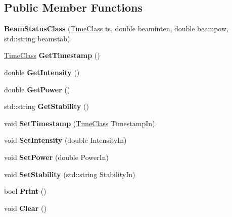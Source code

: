\subsection*{Public Member Functions}
\begin{DoxyCompactItemize}
\item 
\hypertarget{classBeamStatusClass_a16f64e35b4c0c7fb4565b930393cf0dc}{{\bfseries Beam\-Status\-Class} (\hyperlink{classTimeClass}{Time\-Class} ts, double beaminten, double beampow, std\-::string beamstab)}\label{classBeamStatusClass_a16f64e35b4c0c7fb4565b930393cf0dc}

\item 
\hypertarget{classBeamStatusClass_a3099faed7d12197a62ee27dacee0d32d}{\hyperlink{classTimeClass}{Time\-Class} {\bfseries Get\-Timestamp} ()}\label{classBeamStatusClass_a3099faed7d12197a62ee27dacee0d32d}

\item 
\hypertarget{classBeamStatusClass_aee60c7ca2561a801cb80d6c239ca2189}{double {\bfseries Get\-Intensity} ()}\label{classBeamStatusClass_aee60c7ca2561a801cb80d6c239ca2189}

\item 
\hypertarget{classBeamStatusClass_abf408e07c997e60b084dc613d5fda75c}{double {\bfseries Get\-Power} ()}\label{classBeamStatusClass_abf408e07c997e60b084dc613d5fda75c}

\item 
\hypertarget{classBeamStatusClass_a052d6ca339a0ca531de200a6cb790fad}{std\-::string {\bfseries Get\-Stability} ()}\label{classBeamStatusClass_a052d6ca339a0ca531de200a6cb790fad}

\item 
\hypertarget{classBeamStatusClass_a26f08683ffd71565d38714886b130459}{void {\bfseries Set\-Timestamp} (\hyperlink{classTimeClass}{Time\-Class} Timestamp\-In)}\label{classBeamStatusClass_a26f08683ffd71565d38714886b130459}

\item 
\hypertarget{classBeamStatusClass_a6ad6d7fe6847a45a043115f6b452ce4a}{void {\bfseries Set\-Intensity} (double Intensity\-In)}\label{classBeamStatusClass_a6ad6d7fe6847a45a043115f6b452ce4a}

\item 
\hypertarget{classBeamStatusClass_a93db8cf0576994acb051c0c17d714e13}{void {\bfseries Set\-Power} (double Power\-In)}\label{classBeamStatusClass_a93db8cf0576994acb051c0c17d714e13}

\item 
\hypertarget{classBeamStatusClass_a4bae86f8f8d6ab9b74dbe73f456a97c6}{void {\bfseries Set\-Stability} (std\-::string Stability\-In)}\label{classBeamStatusClass_a4bae86f8f8d6ab9b74dbe73f456a97c6}

\item 
\hypertarget{classBeamStatusClass_a5a45cde713baaa1d205b0311c7a3ec23}{bool {\bfseries Print} ()}\label{classBeamStatusClass_a5a45cde713baaa1d205b0311c7a3ec23}

\item 
\hypertarget{classBeamStatusClass_a8b86d3c481eab24e6c8a2fda5940d7d8}{void {\bfseries Clear} ()}\label{classBeamStatusClass_a8b86d3c481eab24e6c8a2fda5940d7d8}

\end{DoxyCompactItemize}
